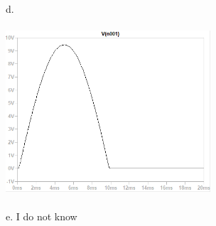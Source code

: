 d.

\includegraphics[width=3in,height=2.5in]{../../Images/OPampsTransistorsDiodesQ17d.png}

e. I do not know \\
